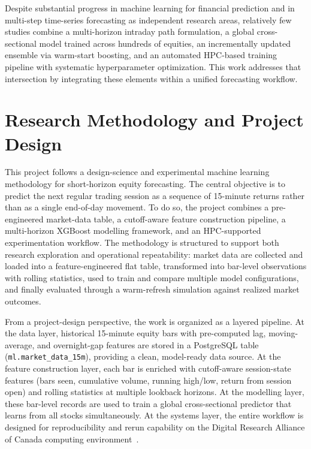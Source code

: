 \documentclass[conference]{IEEEtran}
\begin{document}
Despite substantial progress in machine learning for financial prediction and in multi-step time-series forecasting as independent research areas, relatively few studies combine a multi-horizon intraday path formulation, a global cross-sectional model trained across hundreds of equities, an incrementally updated ensemble via warm-start boosting, and an automated HPC-based training pipeline with systematic hyperparameter optimization. This work addresses that intersection by integrating these elements within a unified forecasting workflow.

\section{Research Methodology and Project Design}\label{sec:methodology}

This project follows a design-science and experimental machine learning methodology for short-horizon equity forecasting. The central objective is to predict the next regular trading session as a sequence of 15-minute returns rather than as a single end-of-day movement. To do so, the project combines a pre-engineered market-data table, a cutoff-aware feature construction pipeline, a multi-horizon XGBoost modelling framework, and an HPC-supported experimentation workflow. The methodology is structured to support both research exploration and operational repeatability: market data are collected and loaded into a feature-engineered flat table, transformed into bar-level observations with rolling statistics, used to train and compare multiple model configurations, and finally evaluated through a warm-refresh simulation against realized market outcomes.

From a project-design perspective, the work is organized as a layered pipeline. At the data layer, historical 15-minute equity bars with pre-computed lag, moving-average, and overnight-gap features are stored in a PostgreSQL table (\texttt{ml.market\_data\_15m}), providing a clean, model-ready data source. At the feature construction layer, each bar is enriched with cutoff-aware session-state features (bars seen, cumulative volume, running high/low, return from session open) and rolling statistics at multiple lookback horizons. At the modelling layer, these bar-level records are used to train a global cross-sectional predictor that learns from all stocks simultaneously. At the systems layer, the entire workflow is designed for reproducibility and rerun capability on the Digital Research Alliance of Canada computing environment~\cite{drac2026hpc,peng2011reproducible}.
\end{document}
